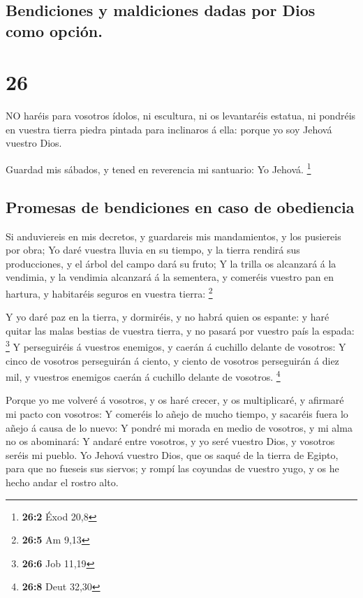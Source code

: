 \hypertarget{bendiciones-y-maldiciones-dadas-por-dios-como-opciuxf3n.}{%
\subsection{Bendiciones y maldiciones dadas por Dios como
opción.}\label{bendiciones-y-maldiciones-dadas-por-dios-como-opciuxf3n.}}

\hypertarget{section-25}{%
\section{26}\label{section-25}}

 NO haréis para vosotros ídolos, ni escultura, ni os
levantaréis estatua, ni pondréis en vuestra tierra piedra pintada para
inclinaros á ella: porque yo soy Jehová vuestro Dios.

 Guardad mis sábados, y tened en reverencia mi santuario: Yo
Jehová. \footnote{\textbf{26:2} Éxod 20,8}

\hypertarget{promesas-de-bendiciones-en-caso-de-obediencia}{%
\subsection{Promesas de bendiciones en caso de
obediencia}\label{promesas-de-bendiciones-en-caso-de-obediencia}}

 Si anduviereis en mis decretos, y guardareis mis
mandamientos, y los pusiereis por obra;  Yo daré vuestra
lluvia en su tiempo, y la tierra rendirá sus producciones, y el árbol
del campo dará su fruto;  Y la trilla os alcanzará á la
vendimia, y la vendimia alcanzará á la sementera, y comeréis vuestro pan
en hartura, y habitaréis seguros en vuestra tierra: \footnote{\textbf{26:5}
  Am 9,13}

 Y yo daré paz en la tierra, y dormiréis, y no habrá quien
os espante: y haré quitar las malas bestias de vuestra tierra, y no
pasará por vuestro país la espada: \footnote{\textbf{26:6} Job 11,19}
 Y perseguiréis á vuestros enemigos, y caerán á cuchillo
delante de vosotros:  Y cinco de vosotros perseguirán á
ciento, y ciento de vosotros perseguirán á diez mil, y vuestros enemigos
caerán á cuchillo delante de vosotros. \footnote{\textbf{26:8} Deut
  32,30}

 Porque yo me volveré á vosotros, y os haré crecer, y os
multiplicaré, y afirmaré mi pacto con vosotros:  Y comeréis
lo añejo de mucho tiempo, y sacaréis fuera lo añejo á causa de lo nuevo:
 Y pondré mi morada en medio de vosotros, y mi alma no os
abominará:  Y andaré entre vosotros, y yo seré vuestro
Dios, y vosotros seréis mi pueblo.  Yo Jehová vuestro Dios,
que os saqué de la tierra de Egipto, para que no fueseis sus siervos; y
rompí las coyundas de vuestro yugo, y os he hecho andar el rostro alto.

